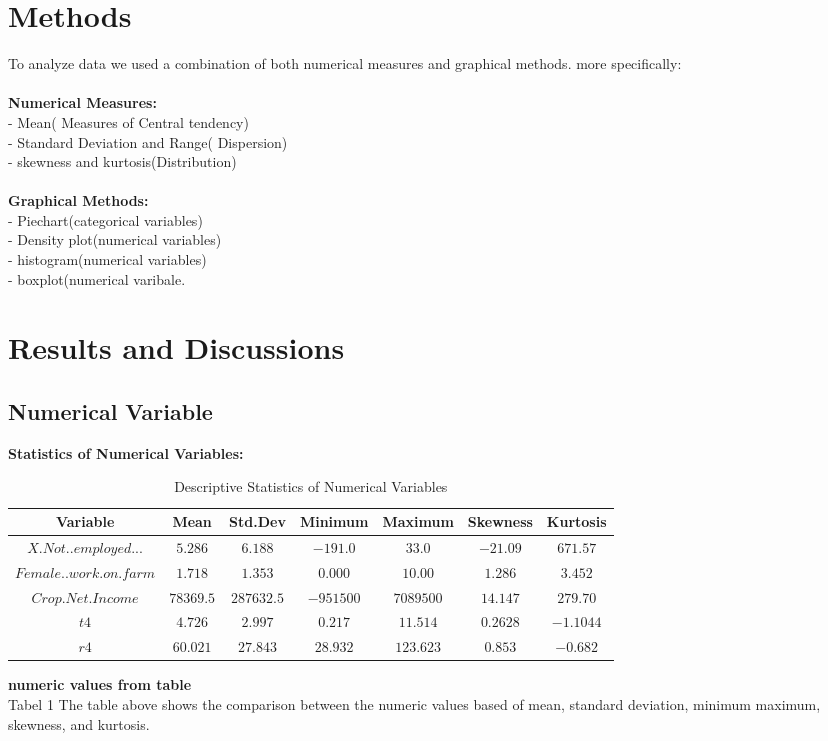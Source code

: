 \documentclass[12pt, a4paper]{article}
\begin{document}
\section{Methods}
 To analyze data we used a combination of both numerical measures and graphical methods. more   specifically:\\\\
 \textbf{Numerical Measures:}\\
 - Mean( Measures of Central tendency)\\
 - Standard Deviation and Range( Dispersion)\\
 - skewness and kurtosis(Distribution)\\\\
 \textbf{Graphical Methods:}\\
- Piechart(categorical variables)\\
-  Density plot(numerical variables)\\
-  histogram(numerical variables)\\
-  boxplot(numerical varibale.

\section{Results and Discussions}
\subsection{Numerical Variable}
\textbf{Statistics of Numerical Variables:}
\begin{table}[h]

\begin{center}
\begin{tabular}{ccccccc}
\hline\hline
\multicolumn{1}{c}{Variable}&\multicolumn{1}{c}{Mean}&\multicolumn{1}{c}{Std.Dev}&\multicolumn{1}{c}{Minimum}&\multicolumn{1}{c}{Maximum}&\multicolumn{1}{c}{Skewness}&\multicolumn{1}{c}{Kurtosis}\tabularnewline
\hline

$X.Not..employed...$&$  5.286$&$ 6.188$&$ -191.0$&$  33.0$&$-21.09$&$671.57$\tabularnewline
$Female..work.on.farm$&$1.718$&$ 1.353$&$ 0.000$&$ 10.00$&$1.286$&$3.452$\tabularnewline
$Crop.Net.Income$&$78369.5$&$ 287632.5$&$ -951500$&$7089500$&$ 14.147$&$279.70$\tabularnewline
$t4$&$4.726$&$2.997$&$ 0.217$&$ 11.514$&$0.2628$&$-1.1044$\tabularnewline
$r4$&$60.021$&$27.843$&$ 28.932$&$123.623$&$0.853$&$-0.682$\tabularnewline
\hline
\end{tabular}\end{center}
\caption{Descriptive Statistics of Numerical Variables}
\end{table}
\justify
\textbf{numeric values from table}\\  
Tabel 1 The table above shows the comparison between the numeric values based of mean, standard deviation, minimum maximum, skewness, and kurtosis.
\end{document}
